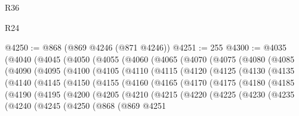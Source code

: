 \begin{lexlean}{R36}
\begin{lexlean}{R24}
\begin{coremodule}
{{{{{{{{{{{{{{{{{{{{{{{{{{{{{{{{{{{{{{{{{{{{{{{{{{{{{{{{{{{{{{{{{{{{{{{{{{{{{{{{{{{{{{{{{{{{{{{{{{{{{{{{{{{{{{{{{{{{{{{{{{{{{{{{{{{{{{{{{{{{{{{{{{{{{{{{{{{{{{{{{{{{{{{{{{{{{{{{{{{{{{{{{{{{{{{{{{{@4250 := @868 (@869 @4246 (@871 @4246))
@4251 := 255
@4300 := @4035
    (@4040
      (@4045
        (@4050
          (@4055
            (@4060
              (@4065
                (@4070
                  (@4075
                    (@4080
                      (@4085
                        (@4090
                          (@4095
                            (@4100
                              (@4105
                                (@4110
                                  (@4115
                                    (@4120
                                      (@4125
                                        (@4130
                                          (@4135
                                            (@4140
                                              (@4145
                                                (@4150
                                                  (@4155
                                                    (@4160
                                                      (@4165
                                                        (@4170
                                                          (@4175
                                                            (@4180
                                                              (@4185
                                                                (@4190
                                                                  (@4195
                                                                    (@4200
                                                                      (@4205
                                                                        (@4210
                                                                          (@4215
                                                                            (@4220
                                                                              (@4225
                                                                                (@4230
                                                                                  (@4235
                                                                                    (@4240
                                                                                      (@4245
                                                                                        (@4250
                                                                                          (@868
                                                                                            (@869
                                                                                              @4251
}}}}}}}}}}}}}}}}}}}}}}}}}}}}}}}}}}}}}}}}}}}}}}}}}}}}}}}}}}}}}}}}}}}}}}}}}}}}}}}}}}}}}}}}}}}}}}}}}}}}}}}}}}}}}}}}}}}}}}}}}}}}}}}}}}}}}}}}}}}}}}}}}}}}}}}}}}}}}}}}}}}}}}}}}}}}}}}}}}}}}}}}}}}}}}}}}}}
\end{coremodule}
\end{lexlean}
\end{lexlean}
